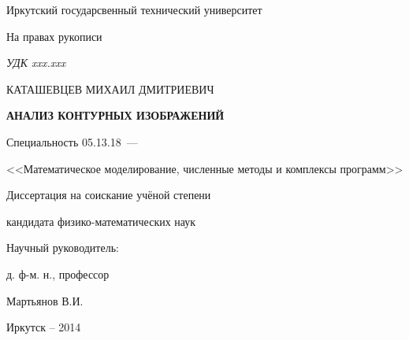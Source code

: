 \thispagestyle{empty}

\begin{center}
Иркутский государсвенный технический университет\par
\par
\end{center}

\vspace{20mm}
\begin{flushright}
На правах рукописи

{\sl УДК xxx.xxx}
\end{flushright}

\vspace{30mm}
\begin{center}
{\large КАТАШЕВЦЕВ МИХАИЛ ДМИТРИЕВИЧ}
\end{center}

\vspace{5mm}
\begin{center}
{\bf \large АНАЛИЗ КОНТУРНЫХ ИЗОБРАЖЕНИЙ
\par}

\vspace{10mm}
{%
Специальность 05.13.18~---

<<Математическое моделирование, численные методы и комплексы программ>>
}

\vspace{10mm}
Диссертация на соискание учёной степени

кандидата физико-математических наук
\end{center}

\vspace{20mm}
\begin{flushright}
Научный руководитель:

д. ф-м. н., профессор

Мартьянов В.И.

\end{flushright}

\vspace{20mm}
\begin{center}
{Иркутск -- 2014}
\end{center}

\newpage